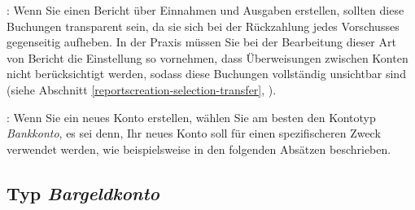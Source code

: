 \Note{}: Wenn Sie einen Bericht über Einnahmen und Ausgaben erstellen, sollten diese Buchungen transparent sein, da sie sich bei der Rückzahlung jedes Vorschusses gegenseitig aufheben. In der Praxis müssen Sie bei der Bearbeitung dieser Art von Bericht die Einstellung so vornehmen, dass Überweisungen zwischen Konten nicht berücksichtigt werden, sodass diese Buchungen vollständig unsichtbar sind (siehe Abschnitt \vref{reportscreation-selection-transfer}, ).

\Note{}: Wenn Sie ein neues Konto erstellen, wählen Sie am besten den Kontotyp \emph{Bankkonto}, es sei denn, Ihr neues Konto soll für einen spezifischeren Zweck verwendet werden, wie beispielsweise in den folgenden Absätzen beschrieben. 

\subsection{Typ \emph{Bargeldkonto}\label{accounts-type-cash}}

